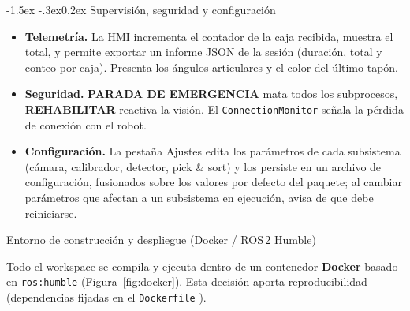 \documentclass[12pt,a4paper]{article}
\makeatletter
\newcommand{\subsecfmt}[1]{%
  {\large\bfseries\color{MediumBlue}#1}%
  \par\vspace{2pt}%
}
\renewcommand\subsection{%
  \@ifstar\subsection@star\subsection@nostar
}
\newcommand\subsection@nostar[1]{%
  \refstepcounter{subsection}%
  \addcontentsline{toc}{subsection}{\protect\numberline{\thesubsection}#1}%
  \vspace{10pt}%
  \subsecfmt{\thesubsection.\enspace #1}%
  \vspace{2pt}%
}
\newcommand\subsection@star[1]{%
  \vspace{10pt}\subsecfmt{#1}\vspace{2pt}%
}
\renewcommand\subsubsection{\@startsection{subsubsection}{3}{\z@}%
  {-1.5ex \@plus -.3ex}{0.2ex}%
  {\normalsize\bfseries\color{MediumBlue}}}
\newcommand{\code}[1]{%
  \begingroup
  \def\_{\char`_\penalty0 }%
  \def\/{\char`/\penalty0 }%
  \texttt{\small #1}%
  \endgroup}
\makeatother
\begin{document}
\subsubsection{Supervisión, seguridad y configuración}

\begin{itemize}
\item \textbf{Telemetría.} La HMI incrementa el contador de la caja recibida, muestra el total, y permite exportar un
informe JSON de la sesión (duración, total y conteo por caja). Presenta
los ángulos articulares y el color del último tapón.
\item \textbf{Seguridad.} \textbf{PARADA DE EMERGENCIA} mata todos los
subprocesos, \textbf{REHABILITAR}
reactiva la visión. El \code{ConnectionMonitor} señala la pérdida de conexión con
el robot.
\item \textbf{Configuración.} La pestaña Ajustes edita los
parámetros de cada subsistema (cámara, calibrador, detector, pick \& sort) y
los persiste en un archivo de configuración, fusionados sobre los
valores por defecto del paquete; al cambiar parámetros que afectan a un subsistema
en ejecución, avisa de que debe reiniciarse.
\end{itemize}

\clearpage
\subsection{Entorno de construcción y despliegue (Docker / ROS\,2 Humble)}
\label{sec:docker}

Todo el workspace se compila y ejecuta dentro de un contenedor
\textbf{Docker} basado en \code{ros:humble} (Figura~\ref{fig:docker}). Esta
decisión aporta reproducibilidad (dependencias fijadas en el
\code{Dockerfile}).
\end{document}
